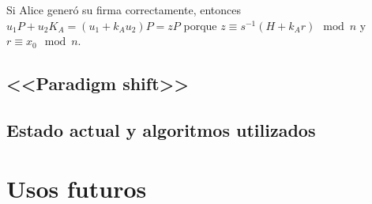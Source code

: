 \documentclass[
  a4paper,
  12pt,
  spanish,
]{scrartcl}
\begin{document}
Si Alice generó su firma correctamente, entonces $u_1P+u_2K_A=(u_1+k_Au_2)P=zP$ porque $z \equiv s^{-1}(H+k_Ar) \mod n$ y $r \equiv x_0 \mod n$.



\subsection{<<Paradigm shift>>}



\subsection{Estado actual y algoritmos utilizados}


\section{Usos futuros}




\newpage
\printbibliography
\end{document}
